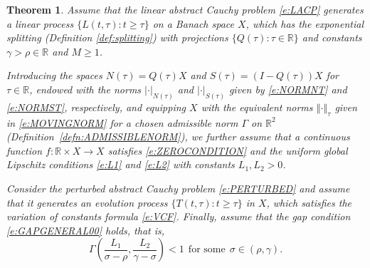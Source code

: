 \documentclass[a4paper,11pt,reqno]{amsart}
\theoremstyle{plain}
\newtheorem{thm}[lem]{Theorem}
\theoremstyle{definition}
\numberwithin{equation}{section}
\newcommand{\R}{\mathbb{R}}
\newcommand{\norm}[1]{\left\Vert#1\right\Vert}
\renewcommand{\geq}{\geqslant}
\begin{document}
\begin{thm}\label{thm-stable-manifold}
Assume that the linear abstract Cauchy problem \eqref{e:LACP} generates a linear process $\{L(t,\tau)\colon t\geq\tau\}$ on a Banach space $X$, which has the exponential splitting (Definition \ref{def:splitting}) with projections $\{Q(\tau)\colon \tau\in\R\}$ and constants $\gamma>\rho\in\R$ and $M\geq 1$.
	
	Introducing the spaces $N(\tau)=Q(\tau)X$ and $S(\tau)=(I-Q(\tau))X$ for $\tau\in\R$, endowed with the norms {$|\cdot|_{N(\tau)}$} and $|\cdot|_{S(\tau)}$ given by \eqref{e:NORMNT} and \eqref{e:NORMST}, respectively,
	and equipping $X$ with the equivalent norms $\norm{\cdot}_{\tau}$ given in \eqref{e:MOVINGNORM} for a chosen admissible norm $\Gamma$ on $\R^2$ (Definition~\ref{defn:ADMISSIBLENORM}), we further assume that a continuous function $f\colon\R\times X\to X$ satisfies \eqref{e:ZEROCONDITION} and the uniform global Lipschitz conditions  
	\eqref{e:L1} and \eqref{e:L2} with constants $L_1,L_2>0$.
	
	Consider the perturbed abstract Cauchy problem \eqref{e:PERTURBED} and assume that it generates an evolution process $\{T(t,\tau)\colon t\geq\tau\}$ in $X$, which satisfies the variation of constants formula \eqref{e:VCF}.
	Finally, assume that {the gap condition \eqref{e:GAPGENERAL00} holds, that is,}
	\begin{equation*}%
	\Gamma\left(\frac{L_1}{\sigma-\rho},\frac{L_2}{\gamma-\sigma}\right)<1\ \ \text{for some}\ \ \sigma\in (\rho,\gamma).
	\end{equation*}


\end{thm}
\end{document}
